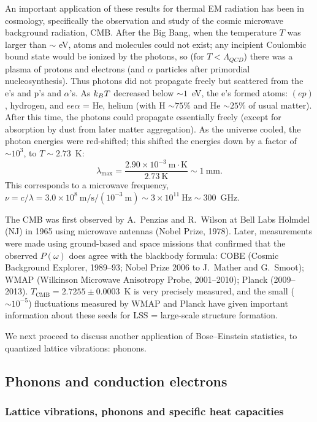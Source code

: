 An important application of these results for thermal EM radiation has been in cosmology, specifically the observation and study of
the cosmic microwave background radiation, CMB. After the Big Bang, when the temperature $T$ was larger than $\sim$ eV, atoms and
molecules could not exist; any incipient Coulombic bound state would be ionized by the photons, so (for $T<\Lambda_{QCD}$) there was a
plasma of protons and electrons (and $\alpha$ particles after primordial nucleosynthesis). Thus photons did not propagate freely but
scattered from the e's and p's and $\alpha$'s. As $k_{B} T$ decreased below $\sim 1$~eV, the e's formed atoms: $(ep)$, hydrogen, and
$ee\alpha$ = He, helium (with H $\sim 75\%$ and He $\sim 25\%$ of usual matter). After this time, the photons could propagate
essentially freely (except for absorption by dust from later matter aggregation). As the universe cooled, the photon energies were
red-shifted; this shifted the energies down by a factor of $\sim 10^3$, to $T\sim 2.73$~K:
\begin{equation}
  \lambda_{\max} = \frac{2.90\times 10^{-3}\ \text{m}\cdot\text{K}}{2.73\ \text{K}}\sim 1\ \text{mm}.
\end{equation}
This corresponds to a microwave frequency, $\nu = c/\lambda = 3.0\times 10^8\ \text{m/s}/(10^{-3}\ \text{m})\sim 3\times 10^{11}\ \text{Hz}\sim 300$~GHz.

The CMB was first observed by A.~Penzias and R.~Wilson at Bell Labs Holmdel (NJ) in 1965 using microwave antennas (Nobel Prize, 1978).
Later, measurements were made using ground-based and space missions that confirmed that the observed $P(\omega)$ does agree with the
blackbody formula: COBE (Cosmic Background Explorer, 1989--93; Nobel Prize 2006 to J.~Mather and G.~Smoot); WMAP (Wilkinson
Microwave Anisotropy Probe, 2001--2010); Planck (2009--2013). $T_{\text{CMB}} = 2.7255\pm 0.0003$~K is very precisely measured, and
the small ($\sim 10^{-5}$) fluctuations measured by WMAP and Planck have given important information about these seeds for LSS =
large-scale structure formation.

We next proceed to discuss another application of Bose--Einstein statistics, to quantized lattice vibrations: phonons.

\subsection{Phonons and conduction electrons}
\subsubsection*{Lattice vibrations, phonons and specific heat capacities}

